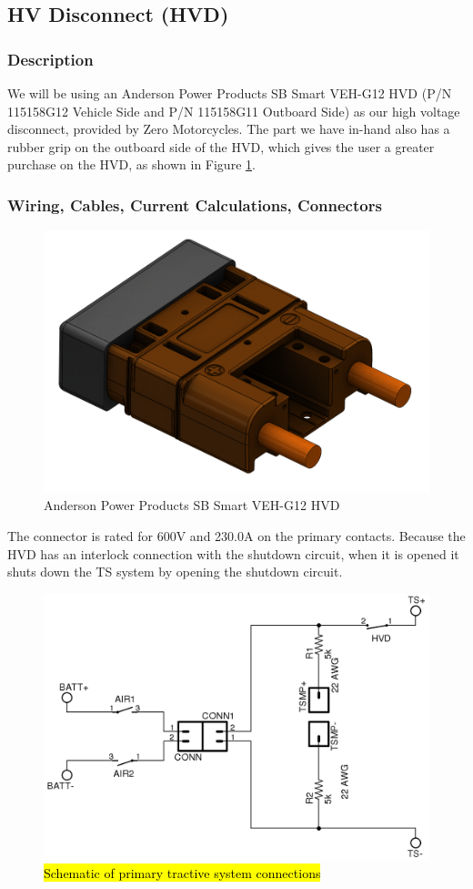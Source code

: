 \documentclass{article}
\DeclareRobustCommand{\hlr}[1]{{\sethlcolor{red}\hl{#1}}}
\begin{document}
    \subsection{HV Disconnect (HVD)} \label{hvdsection}

        \subsubsection{Description}

            We will be using an Anderson Power Products SB Smart VEH-G12 HVD (P/N 115158G12 Vehicle Side and P/N 115158G11 Outboard Side) as our high voltage disconnect, provided by Zero Motorcycles. The part we have in-hand also has a rubber grip on the outboard side of the HVD, which gives the user a greater purchase on the HVD, as shown in Figure \ref{HVDoneside}.

        \subsubsection{Wiring, Cables, Current Calculations, Connectors}

            \begin{figure}[H]
                \centering
                \includegraphics[width = 0.25 \textwidth]{anderson_hvd_interlock}
                \caption{Anderson Power Products SB Smart VEH-G12 HVD}
                \label{HVDoneside}
            \end{figure}


            The connector is rated for 600V and 230.0A on the primary contacts. Because the HVD has an interlock connection with the shutdown circuit, when it is opened it shuts down the TS system by opening the shutdown circuit.

            \begin{figure}[H]
                \centering
                \includegraphics[width = 0.75 \textwidth]{HVD}
                \caption{\hlr{Schematic of primary tractive system connections}}
                \label{HVDschem}
            \end{figure}
\end{document}
